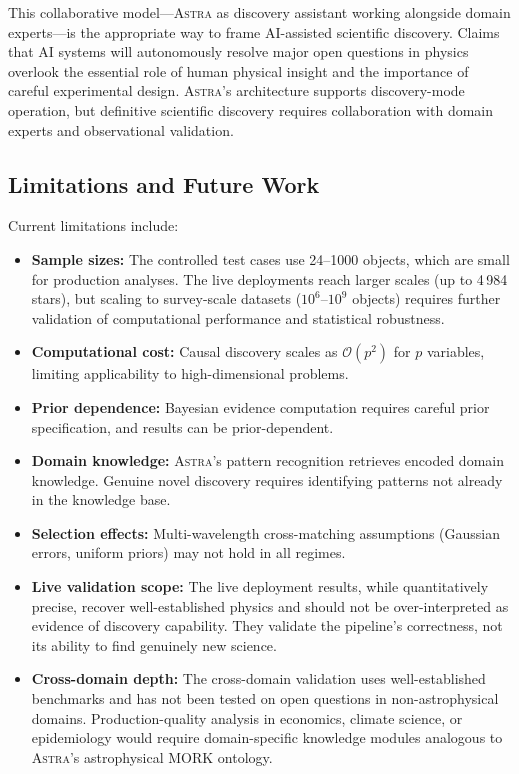 \documentclass[usenatbib]{rasti}
\newcommand{\astra}{\textsc{Astra}\xspace}
\begin{document}
This collaborative model---\astra as discovery assistant working alongside domain experts---is the appropriate way to frame AI-assisted scientific discovery.
Claims that AI systems will autonomously resolve major open questions in physics overlook the essential role of human physical insight and the importance of careful experimental design.
\astra's architecture supports discovery-mode operation, but definitive scientific discovery requires collaboration with domain experts and observational validation.

\subsection{Limitations and Future Work}
\label{sec:discussion:limitations}

Current limitations include:
\begin{itemize}
  \item \textbf{Sample sizes:} The controlled test cases use 24--1000 objects, which are small for production analyses. The live deployments reach larger scales (up to 4\,984 stars), but scaling to survey-scale datasets ($10^{6}$--$10^{9}$ objects) requires further validation of computational performance and statistical robustness.
  \item \textbf{Computational cost:} Causal discovery scales as $\mathcal{O}(p^2)$ for $p$ variables, limiting applicability to high-dimensional problems.
  \item \textbf{Prior dependence:} Bayesian evidence computation requires careful prior specification, and results can be prior-dependent.
  \item \textbf{Domain knowledge:} \astra's pattern recognition retrieves encoded domain knowledge. Genuine novel discovery requires identifying patterns not already in the knowledge base.
  \item \textbf{Selection effects:} Multi-wavelength cross-matching assumptions (Gaussian errors, uniform priors) may not hold in all regimes.
  \item \textbf{Live validation scope:} The live deployment results, while quantitatively precise, recover well-established physics and should not be over-interpreted as evidence of discovery capability. They validate the pipeline's correctness, not its ability to find genuinely new science.
  \item \textbf{Cross-domain depth:} The cross-domain validation uses well-established benchmarks and has not been tested on open questions in non-astrophysical domains. Production-quality analysis in economics, climate science, or epidemiology would require domain-specific knowledge modules analogous to \astra's astrophysical MORK ontology.
\end{itemize}
\end{document}
